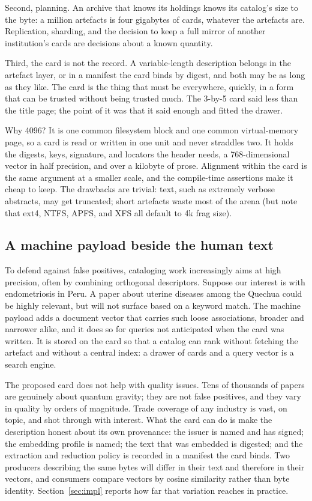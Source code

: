 \documentclass[sigconf]{acmart}
\begin{document}
Second, planning. An archive that knows its holdings knows its catalog's size
to the byte: a million artefacts is four gigabytes of cards, whatever the
artefacts are. Replication, sharding, and the decision to keep a full mirror
of another institution's cards are decisions about a known quantity.

Third, the card is not the record. A variable-length description belongs in
the artefact layer, or in a manifest the card binds by digest, and both may be
as long as they like. The card is the thing that must be everywhere, quickly,
in a form that can be trusted without being trusted much. The 3-by-5 card said
less than the title page; the point of it was that it said enough and fitted
the drawer.

Why 4096? It is one common filesystem block and one common virtual-memory
page, so a card is read or written in one unit and never straddles two. It
holds the digests, keys, signature, and locators the header needs, a
768-dimensional vector in half precision, and over a kilobyte of
prose. Alignment within the card is the same argument at a smaller scale, and
the compile-time assertions make it cheap to keep. The drawbacks are trivial:
text, such as extremely verbose abstracts, may get truncated; short artefacts
waste most of the arena (but note that ext4, NTFS, APFS, and XFS all default
to 4k frag size). 

\subsection{A machine payload beside the human text}

To defend against false positives, cataloging work increasingly aims at high
precision, often by combining orthogonal descriptors. Suppose our interest is
with endometriosis in Peru. A paper about uterine diseases among the Quechua
could be highly relevant, but will not surface based on a keyword match.  The
machine payload adds a document vector that carries such loose associations,
broader and narrower alike, and it does so for queries not anticipated when
the card was written. It is stored on the card so that a catalog can rank
without fetching the artefact and without a central index: a drawer of cards
and a query vector is a search engine.

The proposed card does not help with quality issues. Tens of thousands of
papers are genuinely about quantum gravity; they are not false positives, and
they vary in quality by orders of magnitude. Trade coverage of any industry is
vast, on topic, and shot through with interest. What the card can do is make
the description honest about its own provenance: the issuer is named and has
signed; the embedding profile is named; the text that was embedded is
digested; and the extraction and reduction policy is recorded in a manifest
the card binds. Two producers describing the same bytes will differ in their
text and therefore in their vectors, and consumers compare vectors by cosine
similarity rather than byte identity. Section~\ref{sec:impl} reports how far
that variation reaches in practice.
\end{document}
